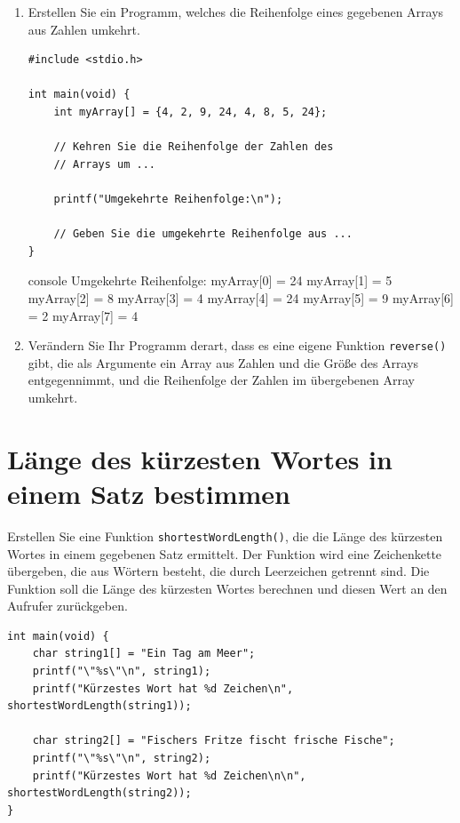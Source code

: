 \begin{enumerate}
    \item Erstellen Sie ein Programm, welches die Reihenfolge eines gegebenen
    Arrays aus Zahlen umkehrt.

\Vorlage
\begin{verbatim}
#include <stdio.h>

int main(void) {
    int myArray[] = {4, 2, 9, 24, 4, 8, 5, 24};

    // Kehren Sie die Reihenfolge der Zahlen des
    // Arrays um ...

    printf("Umgekehrte Reihenfolge:\n");

    // Geben Sie die umgekehrte Reihenfolge aus ...
}
\end{verbatim}

\begin{mybox}[Bildschirmausgabe]{console}
Umgekehrte Reihenfolge:
myArray[0] = 24
myArray[1] = 5
myArray[2] = 8
myArray[3] = 4
myArray[4] = 24
myArray[5] = 9
myArray[6] = 2
myArray[7] = 4
\end{mybox}

  \item Verändern Sie Ihr Programm derart, dass es eine eigene Funktion
  \texttt{reverse()} gibt, die als Argumente ein Array aus Zahlen und die
  Größe des Arrays entgegennimmt, und die Reihenfolge der Zahlen im übergebenen
  Array umkehrt.
\end{enumerate}



\chapter{Länge des kürzesten Wortes in einem Satz bestimmen}

\vspace{10pt}

Erstellen Sie eine Funktion \texttt{shortestWordLength()}, die die Länge
des kürzesten Wortes in einem gegebenen Satz ermittelt. Der Funktion wird eine
Zeichenkette übergeben, die aus Wörtern besteht, die durch Leerzeichen getrennt
sind. Die Funktion soll die Länge des kürzesten Wortes berechnen und diesen Wert
an den Aufrufer zurückgeben.

\Vorlage
\begin{verbatim}
int main(void) {
    char string1[] = "Ein Tag am Meer";
    printf("\"%s\"\n", string1);
    printf("Kürzestes Wort hat %d Zeichen\n", shortestWordLength(string1));

    char string2[] = "Fischers Fritze fischt frische Fische";
    printf("\"%s\"\n", string2);
    printf("Kürzestes Wort hat %d Zeichen\n\n", shortestWordLength(string2));
}
\end{verbatim}

